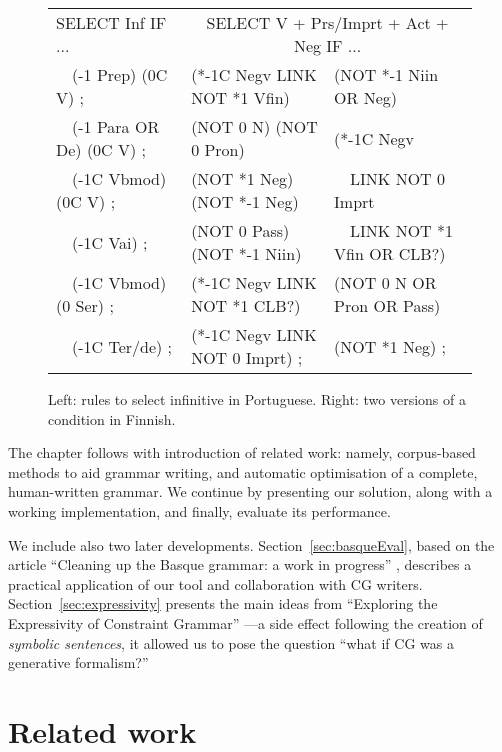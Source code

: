 

\begin{figure}[t]
\ttfamily
\centering
\begin{tabular}{l | @{~~~} l  l}
SELECT Inf IF ... & \multicolumn{2}{c}{SELECT V + Prs/Imprt + Act + Neg IF ...} \\
~~(-1 Prep) (0C V) ;       & (*-1C Negv LINK NOT *1 Vfin)  & (NOT *-1 Niin OR Neg)  \\
~~(-1 Para OR De) (0C V) ; & (NOT 0 N) (NOT 0 Pron)        & (*-1C Negv \\
~~(-1C Vbmod) (0C V) ;     & (NOT *1 Neg) (NOT *-1 Neg)    &  ~~LINK NOT 0 Imprt \\
~~(-1C Vai) ;              & (NOT 0 Pass) (NOT *-1 Niin)   &  ~~LINK NOT *1 Vfin OR CLB?) \\
~~(-1C Vbmod) (0 Ser) ;    & (*-1C Negv LINK NOT *1 CLB?)  & (NOT 0 N OR Pron OR Pass) \\
~~(-1C Ter/de) ;           & (*-1C Negv LINK NOT 0 Imprt) ;  & (NOT *1 Neg) ; \\

\end{tabular}

\caption{Left: rules to select infinitive in Portuguese. 
        Right: two versions of a condition in Finnish.}

\label{fig:infrules}
\end{figure}

The chapter follows with introduction of related work: namely,
corpus-based methods to aid grammar writing, and automatic
optimisation of a complete, human-written grammar. We continue by
presenting our solution, along with a working implementation, and
finally, evaluate its performance.

We include also two later developments. Section~\ref{sec:basqueEval},
based on the article ``Cleaning up the Basque grammar: a work in
progress'' \cite{listenmaa2017basque}, describes a practical
application of our tool and collaboration with CG writers.
Section~\ref{sec:expressivity} presents the main ideas from
``Exploring the Expressivity of Constraint Grammar''
\cite{kokke2017expressivity}---a side effect following the creation of
\emph{symbolic sentences}, it allowed us to pose the question ``what
if CG was a generative formalism?''

\section{Related work}
\label{sec:CGanaRelated}


